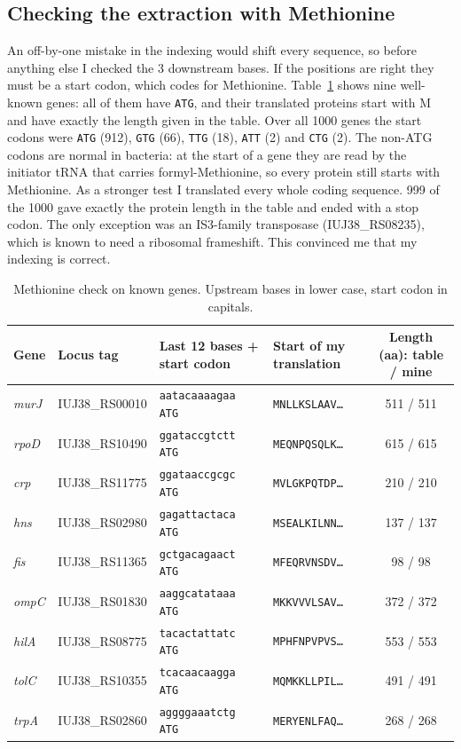 \documentclass[11pt,a4paper]{article}
\newcommand{\gene}[1]{\textit{#1}}
\newcommand{\seqs}[1]{\texttt{#1}}
\begin{document}
\subsection{Checking the extraction with Methionine}
An off-by-one mistake in the indexing would shift every sequence, so before anything else I checked
the 3 downstream bases. If the positions are right they must be a start codon, which codes for
Methionine. Table~\ref{tab:met} shows nine well-known genes: all of them have \seqs{ATG}, and their
translated proteins start with M and have exactly the length given in the table. Over all 1000 genes
the start codons were \seqs{ATG} (912), \seqs{GTG} (66), \seqs{TTG} (18), \seqs{ATT} (2) and \seqs{CTG}
(2). The non-ATG codons are normal in bacteria: at the start of a gene they are read by the initiator
tRNA that carries formyl-Methionine, so every protein still starts with Methionine. As a stronger
test I translated every whole coding sequence. 999 of the 1000 gave exactly the protein length in the
table and ended with a stop codon. The only exception was an IS3-family transposase
(IUJ38\_RS08235), which is known to need a ribosomal frameshift. This convinced me that my indexing
is correct.

\begin{table}[htbp]
\centering
\caption{Methionine check on known genes. Upstream bases in lower case, start codon in capitals.}
\label{tab:met}
\footnotesize
\setlength{\tabcolsep}{4pt}
\begin{tabular}{llllc}
\toprule
Gene & Locus tag & Last 12 bases + start codon & Start of my translation & Length (aa): table / mine\\
\midrule
\gene{murJ} & IUJ38\_RS00010 & \texttt{aatacaaaagaa ATG} & \texttt{MNLLKSLAAV\ldots} & 511 / 511\\
\gene{rpoD} & IUJ38\_RS10490 & \texttt{ggataccgtctt ATG} & \texttt{MEQNPQSQLK\ldots} & 615 / 615\\
\gene{crp}  & IUJ38\_RS11775 & \texttt{ggataaccgcgc ATG} & \texttt{MVLGKPQTDP\ldots} & 210 / 210\\
\gene{hns}  & IUJ38\_RS02980 & \texttt{gagattactaca ATG} & \texttt{MSEALKILNN\ldots} & 137 / 137\\
\gene{fis}  & IUJ38\_RS11365 & \texttt{gctgacagaact ATG} & \texttt{MFEQRVNSDV\ldots} & 98 / 98\\
\gene{ompC} & IUJ38\_RS01830 & \texttt{aaggcatataaa ATG} & \texttt{MKKVVVLSAV\ldots} & 372 / 372\\
\gene{hilA} & IUJ38\_RS08775 & \texttt{tacactattatc ATG} & \texttt{MPHFNPVPVS\ldots} & 553 / 553\\
\gene{tolC} & IUJ38\_RS10355 & \texttt{tcacaacaagga ATG} & \texttt{MQMKKLLPIL\ldots} & 491 / 491\\
\gene{trpA} & IUJ38\_RS02860 & \texttt{aggggaaatctg ATG} & \texttt{MERYENLFAQ\ldots} & 268 / 268\\
\bottomrule
\end{tabular}
\end{table}
\end{document}
